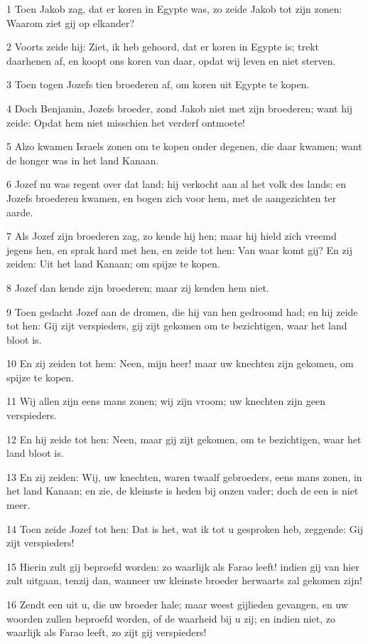 \par 1 Toen Jakob zag, dat er koren in Egypte was, zo zeide Jakob tot zijn zonen: Waarom ziet gij op elkander?
\par 2 Voorts zeide hij: Ziet, ik heb gehoord, dat er koren in Egypte is; trekt daarhenen af, en koopt ons koren van daar, opdat wij leven en niet sterven.
\par 3 Toen togen Jozefs tien broederen af, om koren uit Egypte te kopen.
\par 4 Doch Benjamin, Jozefs broeder, zond Jakob niet met zijn broederen; want hij zeide: Opdat hem niet misschien het verderf ontmoete!
\par 5 Alzo kwamen Israels zonen om te kopen onder degenen, die daar kwamen; want de honger was in het land Kanaan.
\par 6 Jozef nu was regent over dat land; hij verkocht aan al het volk des lands; en Jozefs broederen kwamen, en bogen zich voor hem, met de aangezichten ter aarde.
\par 7 Als Jozef zijn broederen zag, zo kende hij hen; maar hij hield zich vreemd jegens hen, en sprak hard met hen, en zeide tot hen: Van waar komt gij? En zij zeiden: Uit het land Kanaan; om spijze te kopen.
\par 8 Jozef dan kende zijn broederen; maar zij kenden hem niet.
\par 9 Toen gedacht Jozef aan de dromen, die hij van hen gedroomd had; en hij zeide tot hen: Gij zijt verspieders, gij zijt gekomen om te bezichtigen, waar het land bloot is.
\par 10 En zij zeiden tot hem: Neen, mijn heer! maar uw knechten zijn gekomen, om spijze te kopen.
\par 11 Wij allen zijn eens mans zonen; wij zijn vroom; uw knechten zijn geen verspieders.
\par 12 En hij zeide tot hen: Neen, maar gij zijt gekomen, om te bezichtigen, waar het land bloot is.
\par 13 En zij zeiden: Wij, uw knechten, waren twaalf gebroeders, eens mans zonen, in het land Kanaan; en zie, de kleinste is heden bij onzen vader; doch de een is niet meer.
\par 14 Toen zeide Jozef tot hen: Dat is het, wat ik tot u gesproken heb, zeggende: Gij zijt verspieders!
\par 15 Hierin zult gij beproefd worden: zo waarlijk als Farao leeft! indien gij van hier zult uitgaan, tenzij dan, wanneer uw kleinste broeder herwaarts zal gekomen zijn!
\par 16 Zendt een uit u, die uw broeder hale; maar weest gijlieden gevangen, en uw woorden zullen beproefd worden, of de waarheid bij u zij; en indien niet, zo waarlijk als Farao leeft, zo zijt gij verspieders!
